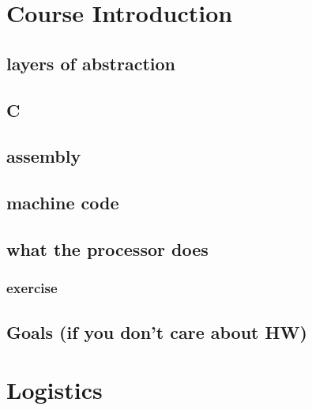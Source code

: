 \section{Course Introduction}

\subsection{layers of abstraction}

\subsection{C}





\subsection{assembly}




\subsection{machine code}



\subsection{what the processor does}




\subsubsection{exercise}


\subsection{Goals (if you don't care about HW)}


\section{Logistics}


